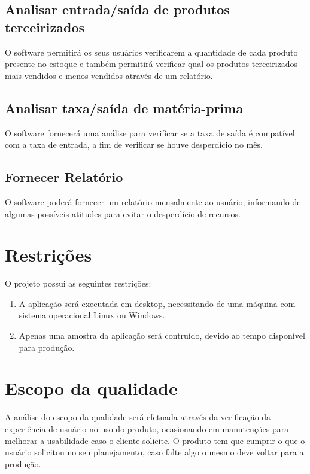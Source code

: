 \begin{appendices}
\subsection{Analisar entrada/saída de produtos terceirizados}
	O software permitirá os seus usuários verificarem a quantidade de cada produto presente no estoque e também permitirá verificar qual os produtos terceirizados mais vendidos e menos vendidos através de um relatório.

\subsection{Analisar taxa/saída de matéria-prima}
	O software fornecerá uma análise para verificar se a taxa de saída é compatível com a taxa de entrada, a fim de verificar se houve desperdício no mês.

\subsection{Fornecer Relatório}
	O software poderá fornecer um relatório mensalmente ao usuário, informando de algumas possíveis atitudes para evitar o desperdício de recursos.

\section{Restrições}
	O projeto possui as seguintes restrições:
	\begin{enumerate}
	\item A aplicação será executada em desktop, necessitando de uma máquina com sistema operacional Linux ou Windows.

	\item Apenas uma amostra da aplicação será contruído, devido ao tempo disponível para produção.
	\end{enumerate}


\section{Escopo da qualidade}
A análise do escopo da qualidade será efetuada através da verificação da experiência de usuário no uso do produto, ocasionando em manutenções para melhorar a usabilidade caso o cliente solicite.
O produto tem que cumprir o que o usuário solicitou no seu planejamento, caso falte algo o mesmo deve voltar para a produção.


\end{appendices}
